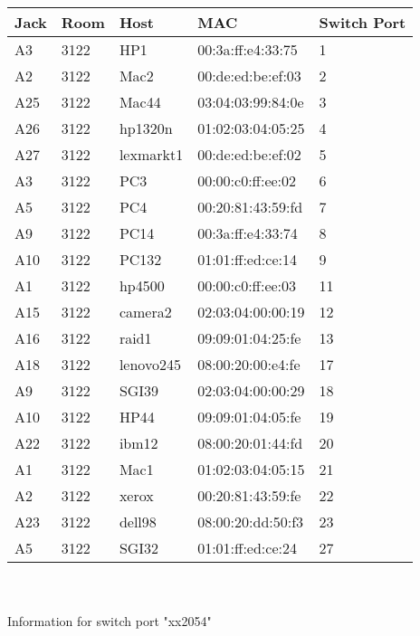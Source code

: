 \documentclass{article}
\begin{document}
\begin{tabular}{| l | l | l | l | l |}
\hline
Jack & Room & Host & MAC & Switch Port \\
\hline
A3 & 3122 & HP1 & 00:3a:ff:e4:33:75 & 1 \\
\hline
A2 & 3122 & Mac2 & 00:de:ed:be:ef:03 & 2 \\
\hline
A25 & 3122 & Mac44 & 03:04:03:99:84:0e & 3 \\
\hline
A26 & 3122 & hp1320n & 01:02:03:04:05:25 & 4 \\
\hline
A27 & 3122 & lexmarkt1 & 00:de:ed:be:ef:02 & 5 \\
\hline
A3 & 3122 & PC3 & 00:00:c0:ff:ee:02 & 6 \\
\hline
A5 & 3122 & PC4 & 00:20:81:43:59:fd & 7 \\
\hline
A9 & 3122 & PC14 & 00:3a:ff:e4:33:74 & 8 \\
\hline
A10 & 3122 & PC132 & 01:01:ff:ed:ce:14 & 9 \\
\hline
A1 & 3122 & hp4500 & 00:00:c0:ff:ee:03 & 11 \\
\hline
A15 & 3122 & camera2 & 02:03:04:00:00:19 & 12 \\
\hline
A16 & 3122 & raid1 & 09:09:01:04:25:fe & 13 \\
\hline
A18 & 3122 & lenovo245 & 08:00:20:00:e4:fe & 17 \\
\hline
A9 & 3122 & SGI39 & 02:03:04:00:00:29 & 18 \\
\hline
A10 & 3122 & HP44 & 09:09:01:04:05:fe & 19 \\
\hline
A22 & 3122 & ibm12 & 08:00:20:01:44:fd & 20 \\
\hline
A1 & 3122 & Mac1 & 01:02:03:04:05:15 & 21 \\
\hline
A2 & 3122 & xerox & 00:20:81:43:59:fe & 22 \\
\hline
A23 & 3122 & dell98 & 08:00:20:dd:50:f3 & 23 \\
\hline
A5 & 3122 & SGI32 & 01:01:ff:ed:ce:24 & 27 \\
\hline
\end{tabular}
\\
\\
Information for switch port "xx2054"
\\
\\
\end{document}
